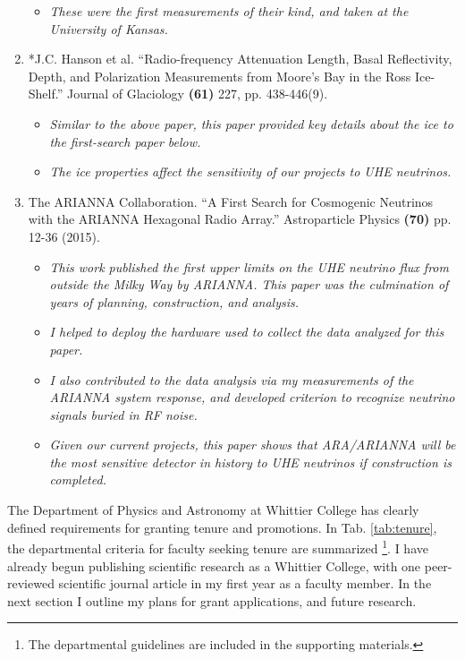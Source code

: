 \documentclass[../../main.tex]{subfiles}
\begin{document}
\begin{enumerate}
\begin{itemize}
\item \textit{These were the first measurements of their kind, and taken at the University of Kansas.}
\end{itemize}
\item *J.C. Hanson et al. ``Radio-frequency Attenuation Length, Basal Reflectivity, Depth, and Polarization Measurements from Moore's Bay in the Ross Ice-Shelf.'' Journal of Glaciology \textbf{(61)} 227, pp. 438-446(9).
\begin{itemize}
\item \textit{Similar to the above paper, this paper provided key details about the ice to the first-search paper below.}
\item \textit{The ice properties affect the sensitivity of our projects to UHE neutrinos.}
\end{itemize}
\item The ARIANNA Collaboration. ``A First Search for Cosmogenic Neutrinos with the ARIANNA Hexagonal Radio Array.'' Astroparticle Physics \textbf{(70)} pp. 12-36 (2015).
\begin{itemize}
\item \textit{This work published the first upper limits on the UHE neutrino flux from outside the Milky Way by ARIANNA.  This paper was the culmination of years of planning, construction, and analysis.}
\item \textit{I helped to deploy the hardware used to collect the data analyzed for this paper.}
\item \textit{I also contributed to the data analysis via my measurements of the ARIANNA system response, and developed criterion to recognize neutrino signals buried in RF noise.}
\item \textit{Given our current projects, this paper shows that ARA/ARIANNA will be the most sensitive detector in history to UHE neutrinos if construction is completed.}
\end{itemize}
\end{enumerate}
The Department of Physics and Astronomy at Whittier College has clearly defined requirements for granting tenure and promotions.  In Tab. \ref{tab:tenure}, the departmental criteria for faculty seeking tenure are summarized \footnote{The departmental guidelines are included in the supporting materials.}.  I have already begun publishing scientific research as a Whittier College, with one peer-reviewed scientific journal article in my first year as a faculty member.  In the next section I outline my plans for grant applications, and future research.
\end{document}
